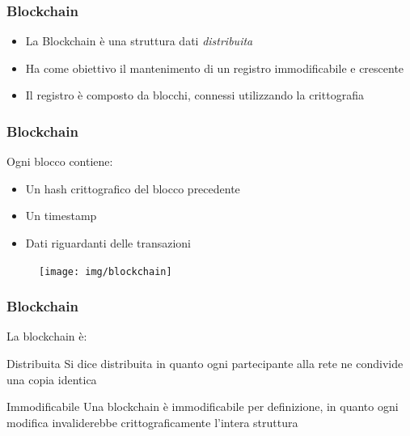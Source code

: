 \documentclass{beamer}
\begin{document}
\begin{frame}
\frametitle{Blockchain}

\begin{itemize}
    \item La Blockchain è una struttura dati \emph{distribuita}
    \item Ha come obiettivo il mantenimento di un registro immodificabile e crescente
    \item Il registro è composto da blocchi, connessi utilizzando la crittografia
\end{itemize}

\end{frame}


\begin{frame}
\frametitle{Blockchain}

Ogni blocco contiene:
\begin{itemize}
    \item Un hash crittografico del blocco precedente
    \item Un timestamp
    \item Dati riguardanti delle transazioni
\end{itemize}

\begin{figure}
\texttt{[image: img/blockchain]}
\end{figure}

\end{frame}


\begin{frame}
\frametitle{Blockchain}

La blockchain è:

\begin{block}{Distribuita}
    Si dice distribuita in quanto ogni partecipante alla rete ne condivide una copia identica
\end{block}

\begin{block}{Immodificabile}
    Una blockchain è immodificabile per definizione, in quanto ogni
    modifica invaliderebbe crittograficamente l’intera struttura
\end{block}

\end{frame}

\end{document}
